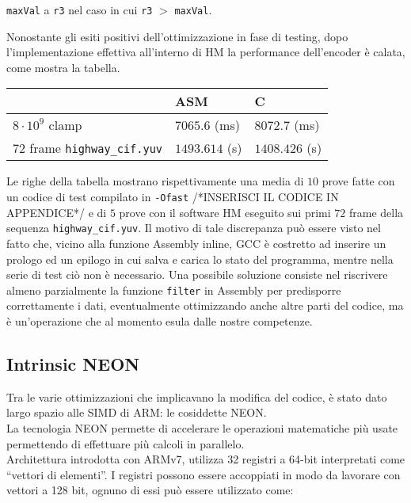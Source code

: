 \verb|maxVal| a \verb|r3| nel caso in cui \verb|r3| $>$ \verb|maxVal|.
\par Nonostante gli esiti positivi dell'ottimizzazione in fase di testing, dopo 
l'implementazione effettiva all'interno di HM la performance dell'encoder è 
calata, come mostra la tabella.
\begin{table}[h!]
	\centering
  \begin{tabular}{l | l | l}
    & ASM & C \\ \hline
    $8\cdot10^9$ clamp & $7065.6$ (ms) & $8072.7$ (ms) \\
    $72$ frame \verb|highway_cif.yuv| & $1493.614$ (s) &  $1408.426$ (s) \\
  \end{tabular}
\end{table}
Le righe della tabella mostrano rispettivamente una media di $10$ prove fatte 
con un codice di test compilato in \verb|-Ofast| /*INSERISCI IL CODICE IN 
APPENDICE*/ e di $5$ prove con il software HM eseguito sui primi $72$ 
frame della sequenza \verb|highway_cif.yuv|.\newline
Il motivo di tale discrepanza può essere visto nel fatto che, vicino alla 
funzione Assembly inline, GCC è costretto ad inserire un prologo ed un epilogo 
in cui salva e carica lo stato del programma, mentre nella serie di test ciò 
non è necessario.\newline
Una possibile soluzione consiste nel riscrivere almeno parzialmente la funzione 
\verb|filter| in Assembly per predisporre correttamente i dati, eventualmente
ottimizzando anche altre parti del codice, ma è un'operazione che al momento 
esula dalle nostre competenze.

\subsection{Intrinsic NEON}

Tra le varie ottimizzazioni che implicavano la modifica del codice, è stato 
dato largo spazio alle SIMD di ARM: le cosiddette NEON.\\
La tecnologia NEON permette di accelerare le operazioni matematiche più usate 
permettendo di effettuare più calcoli in parallelo.\\
Architettura introdotta con ARMv7, utilizza 32 registri a 64-bit interpretati 
come ``vettori di elementi''. I registri possono essere accoppiati in modo da 
lavorare con vettori a 128 bit, ognuno di essi può essere utilizzato come:

